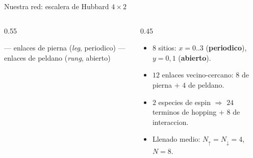 \documentclass[aspectratio=169,10pt]{beamer}
\begin{document}
\begin{frame}{Nuestra red: escalera de Hubbard $4\times2$}
  \begin{columns}[T]
    \begin{column}{0.55\textwidth}
      \vspace{0.3em}
      \small \textcolor{qAccent}{---} enlaces de pierna (\emph{leg}, periodico) \quad
      \textcolor{qMid}{---} enlaces de peldano (\emph{rung}, abierto)
    \end{column}
    \begin{column}{0.45\textwidth}
      \begin{itemize}
        \item $8$ sitios: $x=0..3$ (\textbf{periodico}), $y=0,1$ (\textbf{abierto}).
        \item $12$ enlaces vecino-cercano: $8$ de pierna $+$ $4$ de peldano.
        \item $2$ especies de espin $\Rightarrow$ $24$ terminos de hopping $+$ $8$ de interaccion.
        \item Llenado medio: $N_\uparrow=N_\downarrow=4$, $N=8$.
      \end{itemize}
    \end{column}
  \end{columns}
\end{frame}
\end{document}
